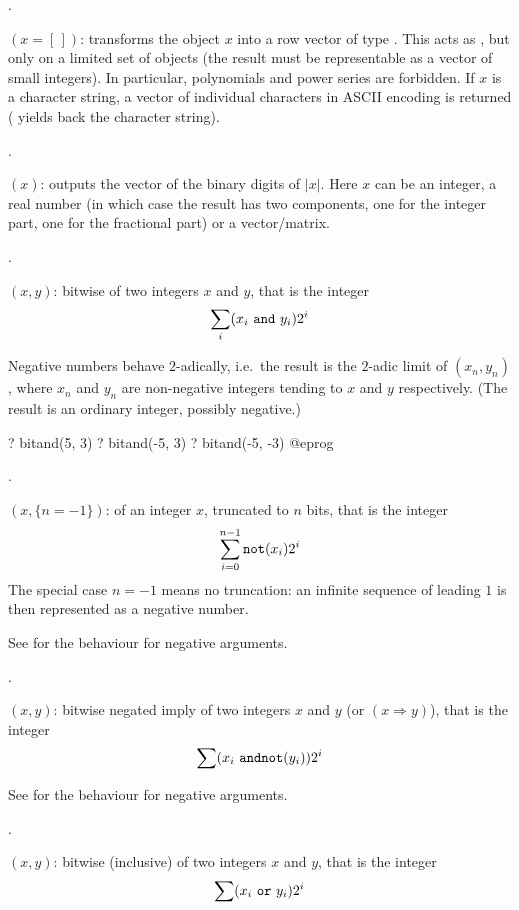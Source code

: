 .

$({x=[\,]})$: transforms the object $x$ into a row
vector of type . This acts as , but only on a
limited set of objects (the result must be representable as a vector of small
integers). In particular, polynomials and power series are forbidden.
If $x$ is a character string, a vector of individual characters in ASCII
encoding is returned ( yields back the character string).

.

$(x)$: outputs the vector of the binary digits of $|x|$.
Here $x$ can be an integer, a real number (in which case the result has two
components, one for the integer part, one for the fractional part) or a
vector/matrix.

.

$(x,y)$:\label{se:bitand} bitwise 
of two integers $x$ and $y$, that is the integer
$$\sum_i (x_i~{\tt and}~y_i) 2^i$$

Negative numbers behave $2$-adically, i.e.~the result is the $2$-adic limit
of $(x_n,y_n)$, where $x_n$ and $y_n$ are non-negative integers
tending to $x$ and $y$ respectively. (The result is an ordinary integer,
possibly negative.)

\bprog
? bitand(5, 3)
? bitand(-5, 3)
? bitand(-5, -3)
@eprog

.

$(x,\{n=-1\})$:  of an integer $x$,
truncated to $n$ bits, that is the integer $$\sum_{i=0}^{n-1} {\tt not}(x_i)
2^i$$ The special case $n=-1$ means no truncation: an infinite sequence of
leading $1$ is then represented as a negative number.

See  for the behaviour for negative arguments.

.

$(x,y)$: bitwise negated imply of two integers $x$ and
$y$ (or  $(x \Rightarrow y)$), that is the integer $$\sum
(x_i~{\tt and not}(y_i)) 2^i$$

See  for the behaviour for negative arguments.

.

$(x,y)$: bitwise (inclusive)
 of two integers $x$ and $y$, that is the integer $$\sum
(x_i~{\tt or}~y_i) 2^i$$


